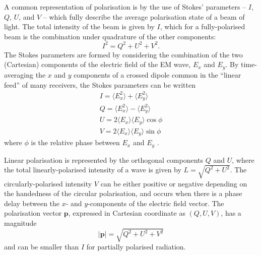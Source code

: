 A common representation of polarisation is by the use of Stokes' parameters -- $I$, $Q$, $U$, and $V$ -- which fully describe the average polarisation state of a beam of light. The total intensity of the beam is given by $I$, which for a fully-polarised beam is the combination under quadrature of the other components:
\begin{equation}
    \label{eq: stokes parameters quadrature}
    I^2 = Q^2 + U^2 + V^2.   
\end{equation}
The Stokes parameters are formed by considering the combination of the two (Cartesian) components of the electric field of the EM wave, $E_x$ and $E_y$. By time-averaging the $x$ and $y$ components of a crossed dipole common in the ``linear feed'' of many receivers, the Stokes parameters can be written
\begin{align}
    I = \langle E_x^2 \rangle + \langle E_y^2 \rangle \label{eq: intro - stokes I linear}\\
    Q = \langle E_x^2 \rangle - \langle E_y^2 \rangle \label{eq: intro - stokes Q linear}\\
    U = 2\langle E_x\rangle \langle E_y\rangle \cos\phi \label{eq: intro - stokes U linear}\\
    V = 2\langle E_x\rangle \langle E_y \rangle \sin\phi \label{eq: intro - stokes V linear}
\end{align}  
where $\phi$ is the relative phase between $E_x$ and $E_y$ \citep{Handbook}.

Linear polarisation is represented by the orthogonal components $Q$ and $U$, where the total linearly-polarised intensity of a wave is given by $L = \sqrt{Q^2 + U^2}$. The circularly-polarised intensity $V$ can be either positive or negative depending on the handedness of the circular polarisation, and occurs when there is a phase delay between the $x$- and $y$-components of the electric field vector. The polarisation vector $\mathbf{p}$, expressed in Cartesian coordinate as $(Q,U,V)$, has a magnitude
\begin{equation}
    \label{eq: polarisation vector magnitude}
    |\mathbf{p}| = \sqrt{Q^2 + U^2 + V^2}
\end{equation}
and can be smaller than $I$ for partially polarised radiation.

